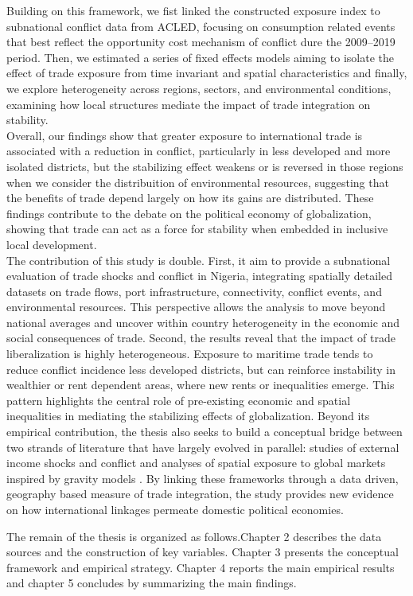 Building on this framework, we fist linked the constructed exposure index to subnational conflict data from ACLED, focusing on consumption related events that best reflect the opportunity cost mechanism of conflict dure the 2009–2019 period. Then, we estimated a series of fixed effects models aiming to isolate the effect of trade exposure from time invariant and spatial characteristics and finally, we explore heterogeneity across regions, sectors, and environmental conditions, examining how local structures mediate the impact of trade integration on stability.\\

Overall, our findings show that greater exposure to international trade is associated with a reduction in conflict, particularly in less developed and more isolated districts, but the stabilizing effect weakens or is reversed in those regions when we consider the distribuition of environmental resources, suggesting that the benefits of trade depend largely on how its gains are distributed. These findings contribute to the debate on the political economy of globalization, showing that trade can act as a force for stability when embedded in inclusive local development.\\

The contribution of this study is double.
First, it aim to provide a subnational evaluation of trade shocks and conflict in Nigeria, integrating spatially detailed datasets on trade flows, port infrastructure, connectivity, conflict events, and environmental resources. This perspective allows the analysis to move beyond national averages and uncover within country heterogeneity in the economic and social consequences of trade.
Second, the results reveal that the impact of trade liberalization is highly heterogeneous. Exposure to maritime trade tends to reduce conflict incidence less developed districts, but can reinforce instability in wealthier or rent dependent areas, where new rents or inequalities emerge. This pattern highlights the central role of pre-existing economic and spatial inequalities in mediating the stabilizing effects of globalization.
Beyond its empirical contribution, the thesis also seeks to build a conceptual bridge between two strands of literature that have largely evolved in parallel: studies of external income shocks and conflict \parencite{berman2015external, amodio2024trade} and analyses of spatial exposure to global markets inspired by gravity models \parencite{anderson2003gravity}. By linking these frameworks through a data driven, geography based measure of trade integration, the study provides new evidence on how international linkages permeate domestic political economies.

The remain of the thesis is organized as follows.Chapter 2 describes the data sources and the construction of key variables. Chapter 3 presents the conceptual framework and empirical strategy. Chapter 4 reports the main empirical results and chapter 5 concludes by summarizing the main findings.

